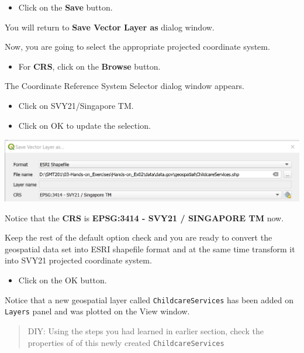 \documentclass[
  letterpaper,
  DIV=11,
  numbers=noendperiod]{scrreprt}
\providecommand{\tightlist}{%
  \setlength{\itemsep}{0pt}\setlength{\parskip}{0pt}}\usepackage{longtable,booktabs,array}
\begin{document}
\begin{itemize}
\tightlist
\item
  Click on the \textbf{Save} button.
\end{itemize}

You will return to \textbf{Save Vector Layer as} dialog window.

Now, you are going to select the appropriate projected coordinate
system.

\begin{itemize}
\tightlist
\item
  For \textbf{CRS}, click on the \textbf{Browse} button.
\end{itemize}

The Coordinate Reference System Selector dialog window appears.

\begin{itemize}
\tightlist
\item
  Click on SVY21/Singapore TM.
\item
  Click on OK to update the selection.
\end{itemize}

\includegraphics{./img02/image14.jpg}

Notice that the \textbf{CRS} is \textbf{EPSG:3414 - SVY21 / SINGAPORE
TM} now.

Keep the rest of the default option check and you are ready to convert
the geospatial data set into ESRI shapefile format and at the same time
transform it into SVY21 projected coordinate system.

\begin{itemize}
\tightlist
\item
  Click on the OK button.
\end{itemize}

Notice that a new geospatial layer called \texttt{ChildcareServices} has
been added on \texttt{Layers} panel and was plotted on the View window.

\begin{quote}
DIY: Using the steps you had learned in earlier section, check the
properties of of this newly created \texttt{ChildcareServices}
\end{quote}
\end{document}
